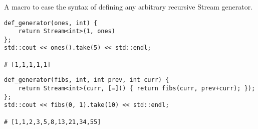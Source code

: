 \subsubsection{}

A macro to ease the syntax of defining any arbitrary recursive Stream generator.

\begin{lstlisting}[title=example]
def_generator(ones, int) {
    return Stream<int>(1, ones)
};
std::cout << ones().take(5) << std::endl;

# [1,1,1,1,1]
\end{lstlisting}

\begin{lstlisting}[title=example]
def_generator(fibs, int, int prev, int curr) {
    return Stream<int>(curr, [=]() { return fibs(curr, prev+curr); });
};
std::cout << fibs(0, 1).take(10) << std::endl;

# [1,1,2,3,5,8,13,21,34,55]
\end{lstlisting}

